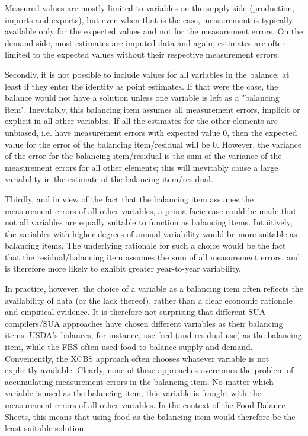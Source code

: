 \documentclass[nojss]{jss}
\begin{document}
Measured values are mostly limited to variables on the supply side (production, imports and exports), but even when that is the case, measurement is typically available only for the expected values and not for the measurement errors. On the demand side, most estimates are imputed data and again, estimates are often limited to the expected values without their respective measurement errors. 

Secondly, it is not possible to include values for all variables in the balance, at least if they enter the identity as point estimates. If that were the case, the balance would not have a solution unless one variable is left as a "balancing item". Inevitably, this balancing item assumes all measurement errors, implicit or explicit in all other variables.  If all the estimates for the other elements are unbiased, i.e. have measurement errors with expected value 0, then the expected value for the error of the balancing item/residual will be 0.  However, the variance of the error for the balancing item/residual is the sum of the variance of the measurement errors for all other elements; this will inevitably cause a large variability in the estimate of the balancing item/residual.  

Thirdly, and in view of the fact that the balancing item assumes the measurement errors of all other variables, a prima facie case could be made that not all variables are equally suitable to function as balancing items. Intuitively, the variables with higher degrees of annual variability would be more suitable as balancing items. The underlying rationale for such a choice would be the fact that the residual/balancing item assumes the sum of all measurement errors, and is therefore more likely to exhibit greater year-to-year variability. 

In practice, however, the choice of a variable as a balancing item often reflects the availability of data (or the lack thereof), rather than a clear economic rationale and empirical evidence.  It is therefore not surprising that different SUA compilers/SUA approaches have chosen different variables as their balancing items. USDA's balances, for instance, use feed (and residual use) as the balancing item, while the FBS often used food to balance supply and demand. Conveniently, the XCBS approach often chooses whatever variable is not explicitly available. Clearly, none of these approaches overcomes the problem of accumulating measurement errors in the balancing item. No matter which variable is used as the balancing item, this variable is fraught with the measurement errors of all other variables. In the context of the Food Balance Sheets, this means that using food as the balancing item would therefore be the least suitable solution. 
\end{document}
